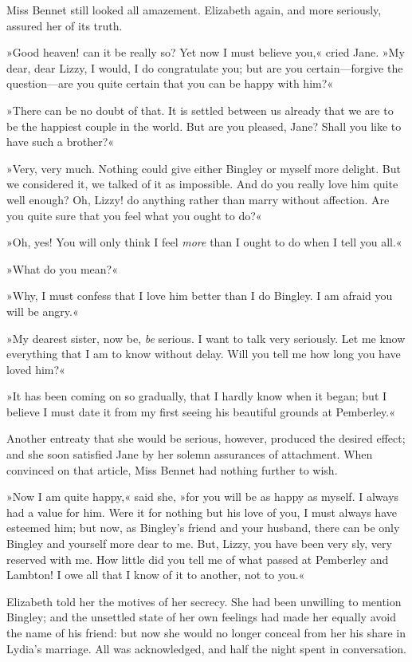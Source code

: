 Miss Bennet still looked all amazement. Elizabeth again, and more seriously, assured her of its truth.

»Good heaven! can it be really so? Yet now I must believe you,« cried Jane. »My dear, dear Lizzy, I would, I do congratulate you; but are you certain—forgive the question—are you quite certain that you can be happy with him?«

»There can be no doubt of that. It is settled between us already that we are to be the happiest couple in the world. But are you pleased, Jane? Shall you like to have such a brother?«

»Very, very much. Nothing could give either Bingley or myself more delight. But we considered it, we talked of it as impossible. And do you really love him quite well enough? Oh, Lizzy! do anything rather than marry without affection. Are you quite sure that you feel what you ought to do?«

»Oh, yes! You will only think I feel \textit{more} than I ought to do when I tell you all.«

»What do you mean?«

»Why, I must confess that I love him better than I do Bingley. I am afraid you will be angry.«

»My dearest sister, now be, \textit{be} serious. I want to talk very seriously. Let me know everything that I am to know without delay. Will you tell me how long you have loved him?«

»It has been coming on so gradually, that I hardly know when it began; but I believe I must date it from my first seeing his beautiful grounds at Pemberley.«

Another entreaty that she would be serious, however, produced the desired effect; and she soon satisfied Jane by her solemn assurances of attachment. When convinced on that article, Miss Bennet had nothing further to wish.

»Now I am quite happy,« said she, »for you will be as happy as myself. I always had a value for him. Were it for nothing but his love of you, I must always have esteemed him; but now, as Bingley's friend and your husband, there can be only Bingley and yourself more dear to me. But, Lizzy, you have been very sly, very reserved with me. How little did you tell me of what passed at Pemberley and Lambton! I owe all that I know of it to another, not to you.«

Elizabeth told her the motives of her secrecy. She had been unwilling to mention Bingley; and the unsettled state of her own feelings had made her equally avoid the name of his friend: but now she would no longer conceal from her his share in Lydia's marriage. All was acknowledged, and half the night spent in conversation.

